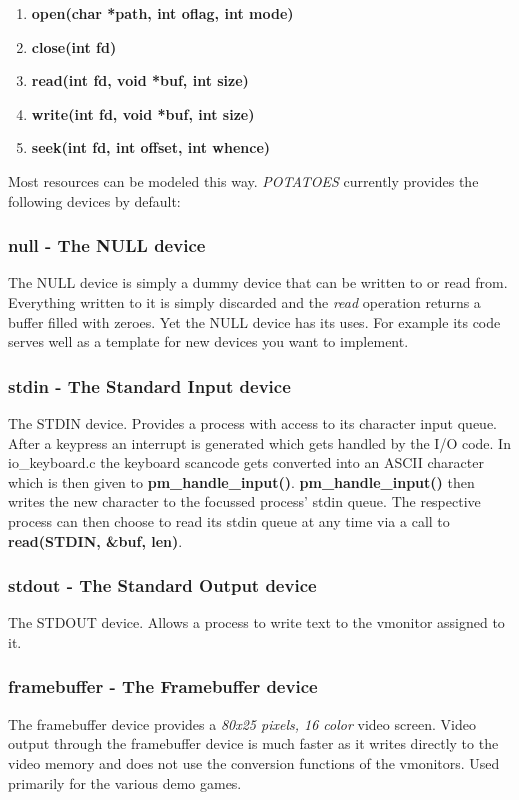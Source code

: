 \documentclass[11pt,a4paper]{scrartcl}
\begin{document}
\begin{enumerate}
\item{\textbf{open(char *path, int oflag, int mode)}}
\item{\textbf{close(int fd)}}
\item{\textbf{read(int fd, void *buf, int size)}}
\item{\textbf{write(int fd, void *buf, int size)}}
\item{\textbf{seek(int fd, int offset, int whence)}}
\end{enumerate}

Most resources can be modeled this way. \textit{POTATOES} currently provides the following devices by default:

\subsubsection{null - The NULL device}
The NULL device is simply a dummy device that can be written to or read from. Everything written to it is simply discarded and the \textit{read} operation returns a buffer filled with zeroes.
Yet the NULL device has its uses. For example its code serves well as a template for new devices you want to implement.

\subsubsection{stdin - The Standard Input device}
The STDIN device. Provides a process with access to its character input queue. After a keypress an interrupt is generated which gets handled by the I/O code. In io\_keyboard.c the keyboard scancode gets converted into an ASCII character which is then given to \textbf{pm\_handle\_input()}. \textbf{pm\_handle\_input()} then writes the new character to the focussed process' stdin queue. The respective process can then choose to read its stdin queue at any time via a call to \textbf{read(STDIN, \&buf, len)}.

\subsubsection{stdout - The Standard Output device}
The STDOUT device. Allows a process to write text to the vmonitor assigned to it.

\subsubsection{framebuffer - The Framebuffer device}
The framebuffer device provides a \textit{80x25 pixels, 16 color} video screen. Video output through the framebuffer device is much faster as it writes directly to the video memory and does not use the conversion functions of the vmonitors. Used primarily for the various demo games.
\end{document}
